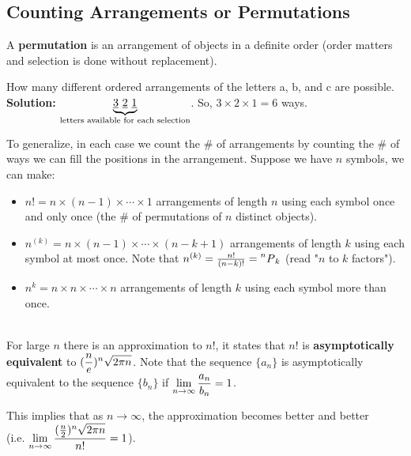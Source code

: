 \subsection{Counting Arrangements or Permutations}

\begin{definition}[Permutation]
    A \textbf{permutation} is an arrangement of objects in a definite order (order matters and selection is done without replacement).
\end{definition}

\begin{example}
    How many different ordered arrangements of the letters a, b, and c are possible.    \\
    \textbf{Solution: } $\underbrace{\text{\underline{3} \underline{2} \underline{1}}}_{\text{letters available for each selection}}$.
    So, $3 \times 2 \times 1 = 6$ ways. \\
\end{example}

To generalize, in each case we count the \# of arrangements by counting the \# of ways we can 
fill the positions in the arrangement. Suppose we have $n$ symbols, we can make:
\begin{itemize}
    \item $n! = n \times (n-1) \times \cdots \times 1$ arrangements of length $n$ using each symbol once and only once
    (the \# of permutations of $n$ distinct objects).
    \item $n^{(k)} = n \times (n-1) \times \cdots \times (n-k+1)$ arrangements of length $k$ using each symbol at most once.
    Note that $n^{(k)} = \frac{n!}{(n-k)!} = \prescript{n}{}{P}_{k}$ (read "$n$ to $k$ factors").
    \item $n^k = n \times n \times \cdots \times n$ arrangements of length $k$ using each symbol more than once.    \\
\end{itemize}

\begin{theorem}
    \phantom{}  \\
    For large $n$ there is an approximation to $n!$, it states that $n!$ is \textbf{asymptotically equivalent} to $\displaystyle (\frac{n}{e})^n \sqrt{2 \pi n}$.
    Note that the sequence $\{a_n\}$ is asymptotically equivalent to the sequence $\{b_n\}$ if $\displaystyle \lim_{n \to \infty}\frac{a_n}{b_n} = 1$.
\end{theorem}

\begin{note}
    This implies that as $n \to \infty$, the approximation becomes better and better    \\
    (i.e. $\displaystyle \lim_{n \to \infty}\frac{(\frac{n}{2})^n \sqrt{2 \pi n}}{n!} = 1$). \\
\end{note}


